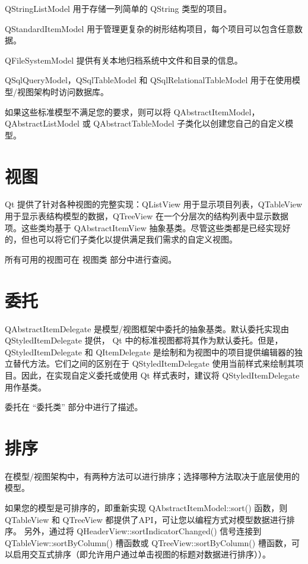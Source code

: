 \begin{compactitem}[\arr]
\item QStringListModel 用于存储一列简单的 QString 类型的项目。
\item QStandardItemModel 用于管理更复杂的树形结构项目，每个项目可以包含任意数据。
\item QFileSystemModel 提供有关本地归档系统中文件和目录的信息。
\item QSqlQueryModel，QSqlTableModel 和 QSqlRelationalTableModel 用于在使用模型/视图架构时访问数据库。
\end{compactitem}


如果这些标准模型不满足您的要求，则可以将 QAbstractItemModel，QAbstractListModel 或 QAbstractTableModel 子类化以创建您自己的自定义模型。

\section{视图}

Qt 提供了针对各种视图的完整实现：QListView 用于显示项目列表，QTableView 用于显示表结构模型的数据，QTreeView 在一个分层次的结构列表中显示数据项。这些类均基于 QAbstractItemView 抽象基类。尽管这些类都是已经实现好的，但也可以将它们子类化以提供满足我们需求的自定义视图。


所有可用的视图可在 视图类 部分中进行查阅。

\section{委托}

QAbstractItemDelegate 是模型/视图框架中委托的抽象基类。默认委托实现由 QStyledItemDelegate 提供， Qt 中的标准视图都将其作为默认委托。但是，QStyledItemDelegate 和 QItemDelegate 是绘制和为视图中的项目提供编辑器的独立替代方法。它们之间的区别在于 QStyledItemDelegate 使用当前样式来绘制其项目。因此，在实现自定义委托或使用 Qt 样式表时，建议将 QStyledItemDelegate 用作基类。


委托在 “委托类” 部分中进行了描述。

\section{排序}

在模型/视图架构中，有两种方法可以进行排序；选择哪种方法取决于底层使用的模型。


如果您的模型是可排序的，即重新实现 QAbstractItemModel::sort() 函数，则 QTableView 和 QTreeView 都提供了API，可让您以编程方式对模型数据进行排序。 另外，通过将 QHeaderView::sortIndicatorChanged() 信号连接到 QTableView::sortByColumn() 槽函数或 QTreeView::sortByColumn() 槽函数，可以启用交互式排序（即允许用户通过单击视图的标题对数据进行排序））。



